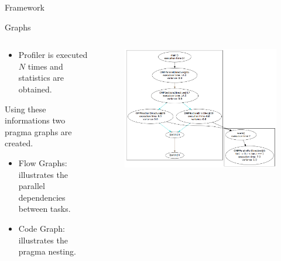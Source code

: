 \documentclass[xcolor=dvipsnames]{beamer}
\begin{document}
\begin{section}{Framework}
\begin{frame}{\hskip 0.3cm Graphs}
\begin{columns}
\begin{column}{5cm}
\begin{itemize}
\item Profiler is executed $N$ times and statistics are obtained.

\end{itemize}

Using these informations two pragma graphs are created.

\begin{itemize}

\item Flow Graphs: illustrates the parallel dependencies between tasks.

\item Code Graph: illustrates the pragma nesting.

\end{itemize}

\end{column}

\begin{column}{6cm}
\vskip -2cm
\begin{figure}
\centering
\includegraphics[scale=0.21]{call_graph.png}

\end{figure}
\end{column}

\end{columns}

\end{frame}













\end{section}
\end{document}
